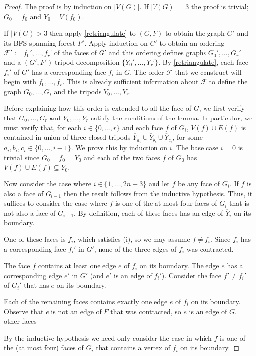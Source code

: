 \documentclass{patmorin}
\begin{document}
\begin{proof}
    The proof is by induction on $|V(G)|$.  If $|V(G)|=3$ the proof is trivial; $G_0=f_0$ and $Y_0=V(f_0)$.

    If $|V(G)> 3$ then apply \cref{retriangulate} to $(G,F)$ to obtain the graph $G'$ and its BFS spanning forest $F'$.  Apply induction on $G'$ to obtain an ordering $\mathcal{F}':=f_0',\ldots,f_{r}'$ of the faces of $G'$ and this ordering defines graphs $G_0',\ldots,G_r'$ and a $(G',F')$-tripod decomposition $\{Y_0',\ldots,Y_r'\}$.  By \cref{retriangulate}, each face $f_i'$ of $G'$ has a corresponding face $f_i$ in $G$.  The order $\mathcal{F}$ that we construct will begin with $f_0,\ldots,f_{r}$.  This is already sufficient information about $\mathcal{F}$ to define the graph $G_0,\ldots,G_r$ and the tripods $Y_0,\ldots,Y_r$.

    Before explaining how this order is extended to all the face of $G$, we first verify that $G_0,\ldots,G_r$ and $Y_0,\ldots,Y_r$ satisfy the conditions of the lemma.  In particular, we must verify that, for each $i\in\{0,\ldots,r\}$ and each face $f$ of $G_i$, $V(f)\cup E(f)$ is contained in union of three closed tripods $\overline{Y}_{a_i}\cup \overline{Y}_{b_i}\cup \overline{Y}_{c_i}$, for some $a_i,b_i,c_i\in\{0,\ldots,i-1\}$.  We prove this by induction on $i$. The base case $i=0$ is trivial since $G_0=f_0=\overline{Y}_0$ and each of the two faces $f$ of $G_0$ has $V(f)\cup E(f)\subseteq\overline{Y}_0$.

    Now consider the case where $i\in\{1,\ldots,2n-3\}$ and let $f$ be any face of $G_i$.  If $f$ is also a face of $G_{i-1}$ then the result follows from the inductive hypothesis.  Thus, it suffices to consider the case where $f$ is one of the at most four faces of $G_i$ that is not also a face of $G_{i-1}$.  By definition, each of these faces has an edge of $\overline{Y}_i$ on its boundary.


    One of these faces is $f_i$, which satisfies (i), so we may assume $f\neq f_i$.  Since $f_i$ has a corresponding face $f_i'$ in $G'$, none of the three edges of $f_i$ was contracted.

    The face $f$ contains at least one edge $e$ of $f_i$ on its boundary.  The edge $e$ has a corresponding edge $e'$ in $G'$ (and $e'$ is an edge of $f_i'$).  Consider the face $f'\neq f_i'$ of $G_i'$ that has $e$ on its boundary.

    Each of the remaining faces contains exactly one edge $e$ of $f_i$ on its boundary.  Observe that $e$ is not an edge of $F$ that was contracted, so $e$ is an edge of $G$.   other faces



    By the inductive hypothesis we need only consider the case in which $f$ is one of the (at most four) faces of $G_i$ that contains a vertex of $f_i$ on its boundary.






\end{proof}
\end{document}
